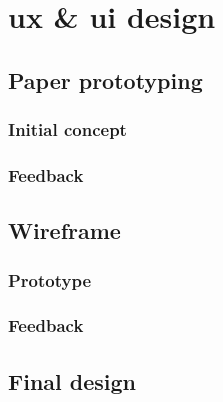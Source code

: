 \chapter{\acrshort{ux} \& \acrshort{ui} design} \label{chapter4}

\section{Paper prototyping} \label{4:paper}

\subsection{Initial concept} \label{4:paper_concept}

\subsection{Feedback} \label{4:paper_feedback}

\section{Wireframe} \label{4:wireframe}

\subsection{Prototype} \label{4:wireframe_prototype}

\subsection{Feedback} \label{4:wireframe_feedback}

\section{Final design} \label{4:final}
